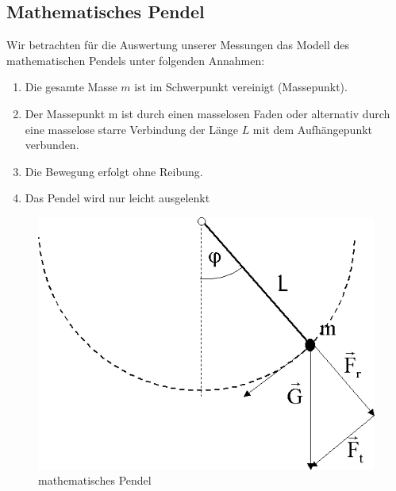 \documentclass[11pt,a4paper,titlepage, ngerman]{article}
\begin{document}
		\subsection{Mathematisches Pendel}
		\label{pendel}
		
			Wir betrachten für die Auswertung unserer Messungen das Modell des mathematischen Pendels unter folgenden Annahmen:
			
			\begin{enumerate}
				\item Die gesamte Masse $m$ ist im Schwerpunkt vereinigt (Massepunkt).
				\item Der Massepunkt m ist durch einen masselosen Faden oder alternativ durch eine masselose starre Verbindung der Länge $L$ mit dem Aufhängepunkt verbunden.
				\item Die Bewegung erfolgt ohne Reibung.
				\item Das Pendel wird nur leicht ausgelenkt %
			\end{enumerate}
			
			\begin{figure}[ht]
				\centering
				\includegraphics[scale=0.4]{mathematischesPendel.png}		
				\caption{mathematisches Pendel}
				\label{fig:matpendel}
			\end{figure}
		
\end{document}

